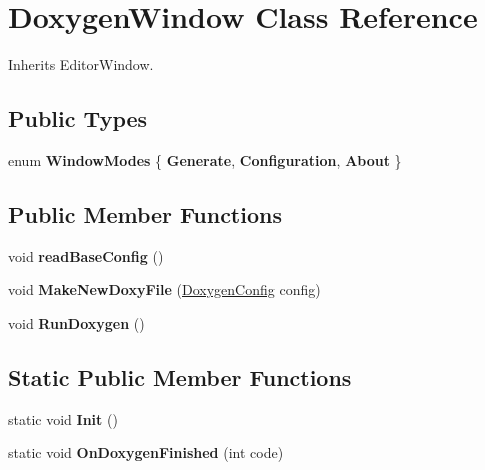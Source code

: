 \hypertarget{class_doxygen_window}{}\section{Doxygen\+Window Class Reference}
\label{class_doxygen_window}


 




Inherits Editor\+Window.

\subsection*{Public Types}
\begin{DoxyCompactItemize}
\item 
enum {\bfseries Window\+Modes} \{ {\bfseries Generate}, 
{\bfseries Configuration}, 
{\bfseries About}
 \}\hypertarget{class_doxygen_window_ad1f6043062e30f52cb634b72294a5676}{}\label{class_doxygen_window_ad1f6043062e30f52cb634b72294a5676}

\end{DoxyCompactItemize}
\subsection*{Public Member Functions}
\begin{DoxyCompactItemize}
\item 
void {\bfseries read\+Base\+Config} ()\hypertarget{class_doxygen_window_a5ba38d9b1d93fa627bc3b53cdd1dda17}{}\label{class_doxygen_window_a5ba38d9b1d93fa627bc3b53cdd1dda17}

\item 
void {\bfseries Make\+New\+Doxy\+File} (\hyperlink{class_doxygen_config}{Doxygen\+Config} config)\hypertarget{class_doxygen_window_abf3c2a3c3a53e6691e58b865da8404de}{}\label{class_doxygen_window_abf3c2a3c3a53e6691e58b865da8404de}

\item 
void {\bfseries Run\+Doxygen} ()\hypertarget{class_doxygen_window_a63924417d5b5b7a71570ec9a9ef1ca5e}{}\label{class_doxygen_window_a63924417d5b5b7a71570ec9a9ef1ca5e}

\end{DoxyCompactItemize}
\subsection*{Static Public Member Functions}
\begin{DoxyCompactItemize}
\item 
static void {\bfseries Init} ()\hypertarget{class_doxygen_window_a48f456c44b07cc9283a0583579b1d65a}{}\label{class_doxygen_window_a48f456c44b07cc9283a0583579b1d65a}

\item 
static void {\bfseries On\+Doxygen\+Finished} (int code)\hypertarget{class_doxygen_window_a2809a93b756a6cfc371ee76a9d7168d7}{}\label{class_doxygen_window_a2809a93b756a6cfc371ee76a9d7168d7}

\end{DoxyCompactItemize}

